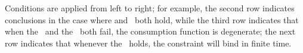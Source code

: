 \begin{table}[b]
\settowidth\TableWidth{\usebox{\LiqConstrScenarios}}
\usebox{\LiqConstrScenarios}

\parbox{\TableWidth}{\footnotesize Conditions are applied from left to right; for example, the second row indicates conclusions in the case where \cncl{\PFGIC} and \RIC~both hold, while the third row indicates that when the \PFGIC~and the \RIC~both fail, the consumption function is degenerate; the next row indicates that whenever the \PFGIC~holds, the constraint will bind in finite time.}

\end{table}



